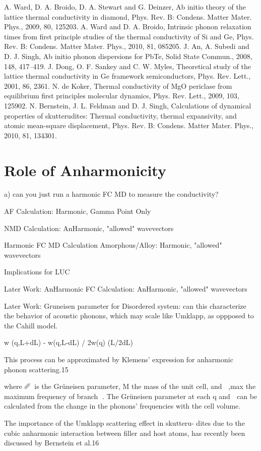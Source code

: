 \documentclass[letterpaper,12pt]{article}
\begin{document}
A. Ward, D. A. Broido, D. A. Stewart and
G. Deinzer, Ab initio theory of the lattice
thermal conductivity in diamond, Phys.
Rev. B: Condens. Matter Mater. Phys.,
2009, 80, 125203.
A. Ward and D. A. Broido, Intrinsic
phonon relaxation times from first
principle
studies
of
the
thermal
conductivity of Si and Ge, Phys. Rev. B:
Condens. Matter Mater. Phys., 2010, 81,
085205.
J. An, A. Subedi and D. J. Singh, Ab initio
phonon dispersions for PbTe, Solid State
Commun., 2008, 148, 417–419.
J. Dong, O. F. Sankey and C. W. Myles,
Theoretical study of the lattice thermal
conductivity
in
Ge
framework
semiconductors, Phys. Rev. Lett., 2001,
86, 2361.
N. de Koker, Thermal conductivity of MgO
periclase from equilibrium first principles
molecular dynamics, Phys. Rev. Lett.,
2009, 103, 125902.
N. Bernstein, J. L. Feldman and
D. J. Singh, Calculations of dynamical
properties of skutterudites: Thermal
conductivity, thermal expansivity, and
atomic mean-square displacement, Phys.
Rev. B: Condens. Matter Mater. Phys.,
2010, 81, 134301.

\section{\label{S-validation}Role of Anharmonicity}

a) can you just run a harmonic FC MD to measure the conductivity?

AF Calculation: Harmonic, Gamma Point Only

NMD Calculation: AnHarmonic, "allowed" wavevectors

Harmonic FC MD Calculation Amorphous/Alloy: Harmonic, "allowed" wavevectors

Implications for LUC

Later Work: AnHarmonic FC Calculation: AnHarmonic, "allowed" wavevectors

Later Work: Gruneisen parameter for Disordered system: can this characterize the behavior of acoustic phonons, which may scale like Umklapp, as oppposed to the Cahill model.

w (q,L+dL) - w(q,L-dL) / 2w(q) (L/2dL)

This process can be approximated by
Klemens’ expression for anharmonic phonon scattering.15

where ␥␭ is the Grüneisen parameter, M the mass of the unit
cell, and ␻␭,max the maximum frequency of branch ␭. The
Grüneisen parameter at each q and ␭ can be calculated from
the change in the phonons’ frequencies with the cell volume.

The importance of the Umklapp scattering effect in skutteru-
dites due to the cubic anharmonic interaction between filler
and host atoms, has recently been discussed by Bernstein et
al.16

\clearpage




\end{document}
